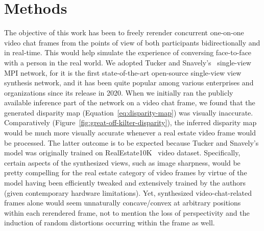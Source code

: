 \chapter{Methods}\label{ch3:methods}

The objective of this work has been to freely rerender concurrent one-on-one video chat frames from the points of view of both participants bidirectionally and in real-time. This would help simulate the experience of conversing face-to-face with a person in the real world. We adopted Tucker and Snavely's~\cite{single_view_mpi} single-view MPI network, for it is the first state-of-the-art open-source single-view view synthesis network, and it has been quite popular among various enterprises and organizations since its release in 2020. When we initially ran the publicly available inference part of the network on a video chat frame, we found that the generated disparity map (Equation~\ref{eq:disparity-map}) was visually inaccurate. Comparatively (Figure~\ref{fig:great-off-kilter-disparity}), the inferred disparity map would be much more visually accurate whenever a real estate video frame would be processed. The latter outcome is to be expected because Tucker and Snavely's model was originally trained on RealEstate10K~\cite{zhou2018stereo} video dataset. Specifically, certain aspects of the synthesized views, such as image sharpness, would be pretty compelling for the real estate category of video frames by virtue of the model having been efficiently tweaked and extensively trained by the authors (given contemporary hardware limitations). Yet, synthesized video-chat-related frames alone would seem unnaturally concave/convex at arbitrary positions within each rerendered frame, not to mention the loss of perspectivity and the induction of random distortions occurring within the frame as well.

